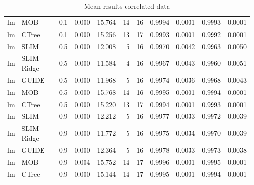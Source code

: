 \begin{table}[!htb]
\begin{tabular}[t]{l|l|r|r|r|r|r|r|r|r|r}
lm & MOB & 0.1 & 0.000 & 15.764 & 14 & 16 & 0.9994 & 0.0001 & 0.9993 & 0.0001\\
lm & CTree & 0.1 & 0.000 & 15.256 & 13 & 17 & 0.9993 & 0.0001 & 0.9992 & 0.0001\\
\hline
lm & SLIM & 0.5 & 0.000 & 12.008 & 5 & 16 & 0.9970 & 0.0042 & 0.9963 & 0.0050\\
lm & SLIM Ridge & 0.5 & 0.000 & 11.584 & 4 & 16 & 0.9967 & 0.0043 & 0.9960 & 0.0051\\
lm & GUIDE & 0.5 & 0.000 & 11.968 & 5 & 16 & 0.9974 & 0.0036 & 0.9968 & 0.0043\\
lm & MOB & 0.5 & 0.000 & 15.768 & 14 & 16 & 0.9995 & 0.0001 & 0.9994 & 0.0001\\
lm & CTree & 0.5 & 0.000 & 15.220 & 13 & 17 & 0.9994 & 0.0001 & 0.9993 & 0.0001\\
\hline
lm & SLIM & 0.9 & 0.000 & 12.212 & 5 & 16 & 0.9977 & 0.0033 & 0.9972 & 0.0039\\
lm & SLIM Ridge & 0.9 & 0.000 & 11.772 & 5 & 16 & 0.9975 & 0.0034 & 0.9970 & 0.0039\\
lm & GUIDE & 0.9 & 0.000 & 12.364 & 5 & 16 & 0.9978 & 0.0033 & 0.9973 & 0.0038\\
lm & MOB & 0.9 & 0.004 & 15.752 & 14 & 17 & 0.9996 & 0.0001 & 0.9995 & 0.0001\\
lm & CTree & 0.9 & 0.000 & 15.144 & 14 & 17 & 0.9995 & 0.0001 & 0.9994 & 0.0001\\
\hline
\end{tabular}
\caption{Mean results correlated data}
\label{tab:linear_smooth_correlated_summary}
\end{table} 


